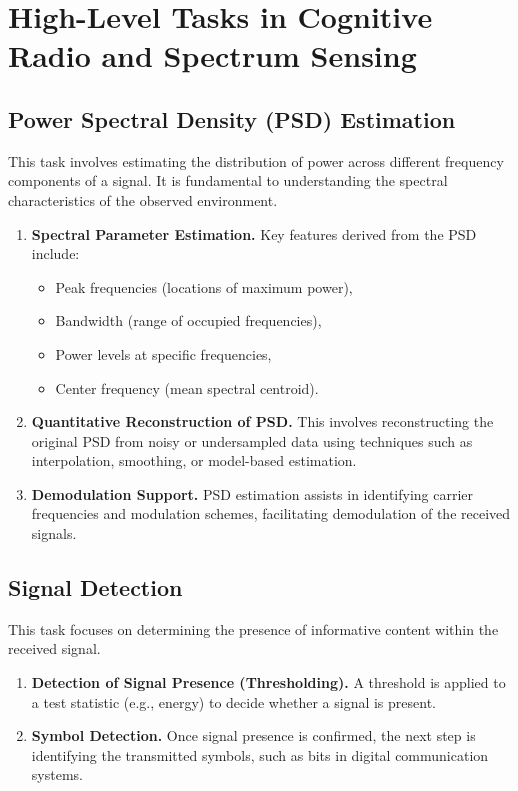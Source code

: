 \documentclass[14pt]{book}
\title{\courseName}
\begin{document}
\maketitle
\thispagestyle{fancy}

\section{High-Level Tasks in Cognitive Radio and Spectrum Sensing}

\subsection{Power Spectral Density (PSD) Estimation}
This task involves estimating the distribution of power across different frequency components of a signal. It is fundamental to understanding the spectral characteristics of the observed environment.

\begin{enumerate}
	\item \textbf{Spectral Parameter Estimation.} Key features derived from the PSD include:
	\begin{itemize}
		\item Peak frequencies (locations of maximum power),
		\item Bandwidth (range of occupied frequencies),
		\item Power levels at specific frequencies,
		\item Center frequency (mean spectral centroid).
	\end{itemize}
	
	\item \textbf{Quantitative Reconstruction of PSD.} This involves reconstructing the original PSD from noisy or undersampled data using techniques such as interpolation, smoothing, or model-based estimation.
	
	\item \textbf{Demodulation Support.} PSD estimation assists in identifying carrier frequencies and modulation schemes, facilitating demodulation of the received signals.
\end{enumerate}

\subsection{Signal Detection}
This task focuses on determining the presence of informative content within the received signal.

\begin{enumerate}
	\item \textbf{Detection of Signal Presence (Thresholding).} A threshold is applied to a test statistic (e.g., energy) to decide whether a signal is present.
	
	\item \textbf{Symbol Detection.} Once signal presence is confirmed, the next step is identifying the transmitted symbols, such as bits in digital communication systems.
\end{enumerate}
\end{document}
